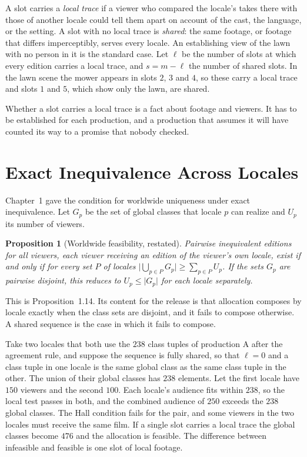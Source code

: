 \documentclass[11pt,twoside,openright]{book}
\theoremstyle{plain}
\newtheorem{proposition}[theorem]{Proposition}
\theoremstyle{definition}
\theoremstyle{remark}
\begin{document}
A slot carries a \emph{local trace} if a viewer who compared the locale's takes there with those of another locale could tell them apart on account of the cast, the language, or the setting. A slot with no local trace is \emph{shared}: the same footage, or footage that differs imperceptibly, serves every locale. An establishing view of the lawn with no person in it is the standard case. Let $\ell$ be the number of slots at which every edition carries a local trace, and $s=m-\ell$ the number of shared slots. In the lawn scene the mower appears in slots $2$, $3$ and $4$, so these carry a local trace and slots $1$ and $5$, which show only the lawn, are shared.

Whether a slot carries a local trace is a fact about footage and viewers. It has to be established for each production, and a production that assumes it will have counted its way to a promise that nobody checked.

\section{Exact Inequivalence Across Locales}\label{sec:exact11}

Chapter~1 gave the condition for worldwide uniqueness under exact inequivalence. Let $G_p$ be the set of global classes that locale $p$ can realize and $U_p$ its number of viewers.

\begin{proposition}[Worldwide feasibility, restated]\label{prop:global11}
Pairwise inequivalent editions for all viewers, each viewer receiving an edition of the viewer's own locale, exist if and only if for every set $P$ of locales $\lvert\bigcup_{p\in P}G_p\rvert\ge\sum_{p\in P}U_p$. If the sets $G_p$ are pairwise disjoint, this reduces to $U_p\le\lvert G_p\rvert$ for each locale separately.
\end{proposition}

This is Proposition~1.14. Its content for the release is that allocation composes by locale exactly when the class sets are disjoint, and it fails to compose otherwise. A shared sequence is the case in which it fails to compose.

Take two locales that both use the $238$ class tuples of production A after the agreement rule, and suppose the sequence is fully shared, so that $\ell=0$ and a class tuple in one locale is the same global class as the same class tuple in the other. The union of their global classes has $238$ elements. Let the first locale have $150$ viewers and the second $100$. Each locale's audience fits within $238$, so the local test passes in both, and the combined audience of $250$ exceeds the $238$ global classes. The Hall condition fails for the pair, and some viewers in the two locales must receive the same film. If a single slot carries a local trace the global classes become $476$ and the allocation is feasible. The difference between infeasible and feasible is one slot of local footage.
\end{document}
